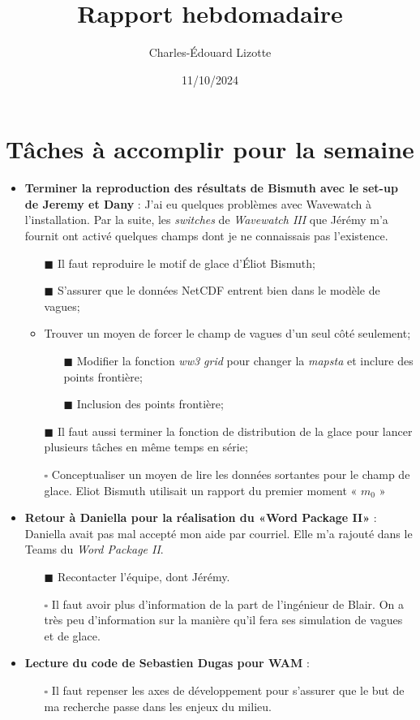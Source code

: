 \documentclass[10pt]{article}
\author{Charles-Édouard Lizotte}
\date{11/10/2024}
\title{Rapport hebdomadaire}
\numberwithin{equation}{section}
\renewcommand{\boxtimes}{\blacksquare}
\begin{document}
\section{Tâches à accomplir pour la semaine}
\label{sec:org3ede40e}

\begin{itemize}
\item\relax [3/4] \textbf{Terminer la reproduction des résultats de Bismuth avec le set-up de Jeremy et Dany} : J'ai eu quelques problèmes avec Wavewatch à l'installation. Par la suite, les \emph{switches} de \emph{Wavewatch III} que Jérémy m'a fournit ont activé quelques champs dont je ne connaissais pas l'existence.
\begin{itemize}
\item[{$\boxtimes$}] Il faut reproduire le motif de glace d'Éliot Bismuth;
\item[{$\boxtimes$}] S'assurer que le données NetCDF entrent bien dans le modèle de vagues;
\item\relax [2/2] Trouver un moyen de forcer le champ de vagues d'un seul côté seulement;
\begin{itemize}
\item[{$\boxtimes$}] Modifier la fonction \emph{ww3 grid} pour changer la \emph{mapsta} et inclure des points frontière;
\item[{$\boxtimes$}] Inclusion des points frontière;
\end{itemize}
\item[{$\boxtimes$}] Il faut aussi terminer la fonction de distribution de la glace pour lancer plusieurs tâches en même temps en série;
\item[{$\square$}] Conceptualiser un moyen de lire les données sortantes pour le champ de glace. Eliot Bismuth utilisait un rapport du premier moment « \(m_0\) »
\end{itemize}

\item\relax [1/2] \textbf{Retour à Daniella pour la réalisation du «Word Package II»} : Daniella avait pas mal accepté mon aide par courriel. Elle m'a rajouté dans le Teams du \emph{Word Package II}.
\begin{itemize}
\item[{$\boxtimes$}] Recontacter l'équipe, dont Jérémy.
\item[{$\square$}] Il faut avoir plus d'information de la part de l'ingénieur de Blair. On a très peu d'information sur la manière qu'il fera ses simulation de vagues et de glace.
\end{itemize}

\item\relax [0/1] \textbf{Lecture du code de Sebastien Dugas pour WAM} :
\begin{itemize}
\item[{$\square$}] Il faut repenser les axes de développement pour s'assurer que le but de ma recherche passe dans les enjeux du milieu.
\end{itemize}
\end{itemize}
\end{document}
